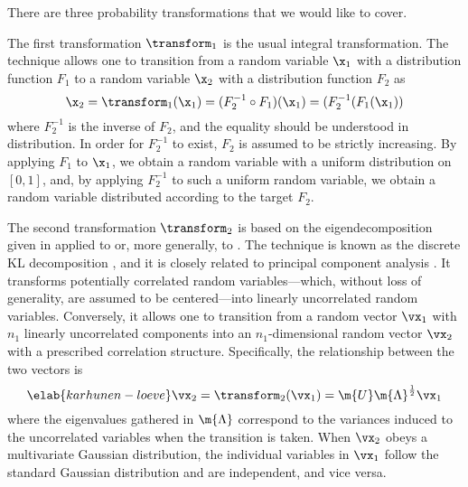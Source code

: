 There are three probability transformations that we would like to cover.

The first transformation $\transform_1$ is the usual integral transformation.
The technique allows one to transition from a random variable $\x_1$ with a
distribution function $F_1$ to a random variable $\x_2$ with a distribution
function $F_2$ as
\[
  \x_2 = \transform_1(\x_1) = (F_2^{-1} \circ F_1)(\x_1) = (F_2^{-1}(F_1(\x_1))
\]
where $F_2^{-1}$ is the inverse of $F_2$, and the equality should be understood
in distribution. In order for $F_2^{-1}$ to exist, $F_2$ is assumed to be
strictly increasing. By applying $F_1$ to $\x_1$, we obtain a random variable
with a uniform distribution on $[0, 1]$, and, by applying $F_2^{-1}$ to such a
uniform random variable, we obtain a random variable distributed according to
the target $F_2$.

The second transformation $\transform_2$ is based on the eigendecomposition
given in  applied to  or, more
generally, to . The technique is known as the discrete
\acf{KL} decomposition \cite{ghanem1991, xiu2010}, and it is closely related to
principal component analysis \cite{hastie2013}. It transforms potentially
correlated random variables---which, without loss of generality, are assumed to
be centered---into linearly uncorrelated random variables. Conversely, it allows
one to transition from a random vector $\vx_1$ with $n_1$ linearly uncorrelated
components into an $n_1$-dimensional random vector $\vx_2$ with a prescribed
correlation structure. Specifically, the relationship between the two vectors is
\begin{equation} \elab{karhunen-loeve}
  \vx_2 = \transform_2(\vx_1) = \m{U} \m{\Lambda}^\frac{1}{2} \vx_1
\end{equation}
where the eigenvalues gathered in $\m{\Lambda}$ correspond to the variances
induced to the uncorrelated variables when the transition is taken. When $\vx_2$
obeys a multivariate Gaussian distribution, the individual variables in $\vx_1$
follow the standard Gaussian distribution and are independent, and vice versa.


